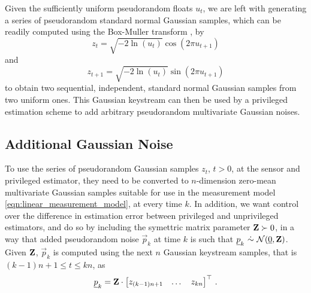 \documentclass[letterpaper, 10 pt, conference]{IEEEtran}
\theoremstyle{definition}
\begin{document}
Given the sufficiently uniform pseudorandom floats $u_t$, we are left with generating a series of pseudorandom standard normal Gaussian samples, which can be readily computed using the Box-Muller transform \cite{paleyFourierTransformsComplex1934}, by
\begin{equation}
   z_t = \sqrt{-2\ln (u_t)}\cos(2\pi u_{t+1})
\end{equation}
and
\begin{equation}
   z_{t+1} = \sqrt{-2\ln (u_t)}\sin(2\pi u_{t+1})
\end{equation}
to obtain two sequential, independent, standard normal Gaussian samples from two uniform ones. This Gaussian keystream can then be used by a privileged estimation scheme to add arbitrary pseudorandom multivariate Gaussian noises.

% 
% 

\subsection{Additional Gaussian Noise}\label{subsec:adding_privilege_noise}
To use the series of pseudorandom Gaussian samples $z_t$, $t>0$, at the sensor and privileged estimator, they need to be converted to $n$-dimension zero-mean multivariate Gaussian samples suitable for use in the measurement model \eqref{eqn:linear_measurement_model}, at every time $k$. In addition, we want control over the difference in estimation error between privileged and unprivileged estimators, and do so by including the symettric matrix parameter ${{\mathbf{Z}}}\succ 0$, in a way that added pseudorandom noise $\vec{p}_k$ at time $k$ is such that $\vec{p}_k\ \dot{\sim}\ \mathcal{N}(\vec{0},\mat{Z})$. Given ${{\mathbf{Z}}}$, $\vec{p}_k$ is computed using the next $n$ Gaussian keystream samples, that is $(k-1)n+1\leq t\leq kn$, as
\begin{equation}
   {\underline{p}}_k = {{\mathbf{Z}}}\cdot
   \begin{bmatrix}
      z_{(k-1)n+1} & \dots & z_{kn}
   \end{bmatrix}^\top\,.
\end{equation}
\end{document}
